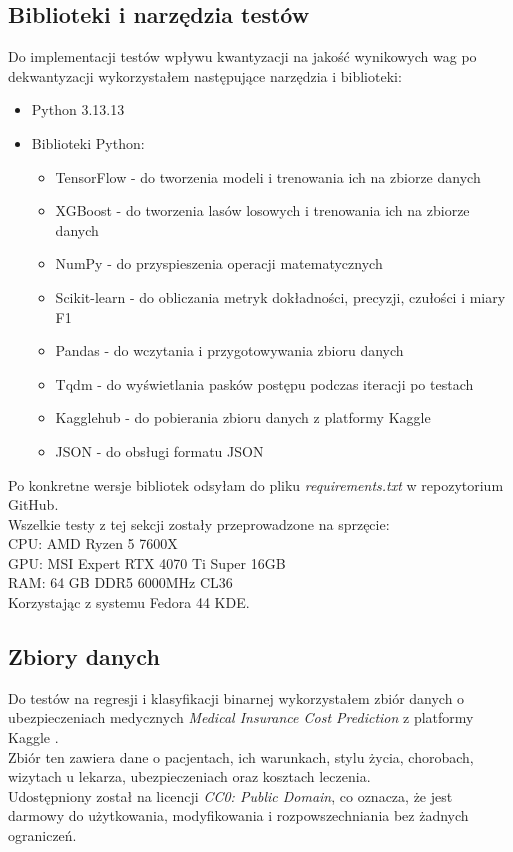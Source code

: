 \subsection{Biblioteki i narzędzia testów}
Do implementacji testów wpływu kwantyzacji na jakość wynikowych wag po dekwantyzacji wykorzystałem następujące narzędzia i biblioteki:
\begin{itemize}
    \item Python 3.13.13
    \item Biblioteki Python:
    \begin{itemize}
        \item TensorFlow - do tworzenia modeli i trenowania ich na zbiorze danych
        \item XGBoost - do tworzenia lasów losowych i trenowania ich na zbiorze danych
        \item NumPy - do przyspieszenia operacji matematycznych
        \item Scikit-learn - do obliczania metryk dokładności, precyzji, czułości i miary F1
        \item Pandas - do wczytania i przygotowywania zbioru danych
        \item Tqdm - do wyświetlania pasków postępu podczas iteracji po testach
        \item Kagglehub - do pobierania zbioru danych z platformy Kaggle
        \item JSON - do obsługi formatu JSON
    \end{itemize}
\end{itemize}
Po konkretne wersje bibliotek odsyłam do pliku \textit{requirements.txt} w repozytorium GitHub. \\

Wszelkie testy z tej sekcji zostały przeprowadzone na sprzęcie: \\
CPU: AMD Ryzen 5 7600X \\
GPU: MSI Expert RTX 4070 Ti Super 16GB\\
RAM: 64 GB DDR5 6000MHz CL36 \\
Korzystając z systemu Fedora 44 KDE.
\subsection{Zbiory danych}
Do testów na regresji i klasyfikacji binarnej wykorzystałem zbiór danych o ubezpieczeniach medycznych \textit{Medical Insurance Cost Prediction} z platformy Kaggle \cite{thalla2025medical}. \\
Zbiór ten zawiera dane o pacjentach, ich warunkach, stylu życia, chorobach, wizytach u lekarza, ubezpieczeniach oraz kosztach leczenia. \\
Udostępniony został na licencji \textit{CC0: Public Domain}, co oznacza, że jest darmowy do użytkowania, modyfikowania i rozpowszechniania bez żadnych ograniczeń.

